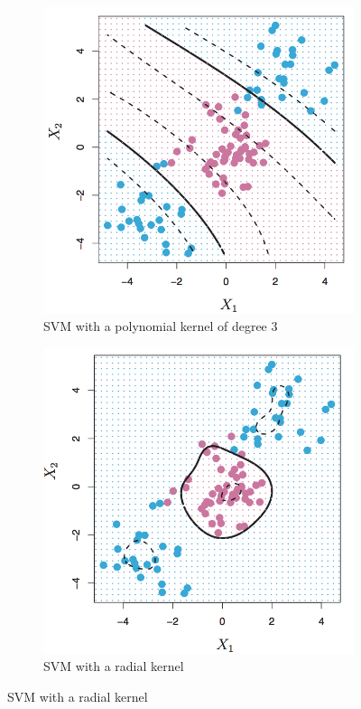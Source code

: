 \documentclass[CS5104-Notes.tex]{subfiles}
\begin{document}
\begin{figure}[H]
\centering
\begin{subfigure}{0.4\textwidth}
  \centering
  \includegraphics[width=1\textwidth, keepaspectratio]{imgs/polynomial-kernel.png}
  \caption{SVM with a polynomial kernel of degree 3}
\end{subfigure}
\hspace*{\fill}
\begin{subfigure}{0.4\textwidth}
  \centering
  \includegraphics[width=1\textwidth, keepaspectratio]{imgs/radial-kernel.png}
  \caption{SVM with a radial kernel}
\end{subfigure}
\end{figure}
\end{document}

